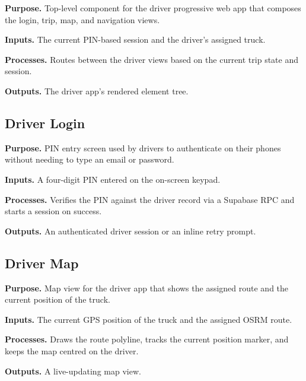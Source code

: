 \noindent\textbf{Purpose.} Top-level component for the driver progressive web app that composes the login, trip, map, and navigation views.

\noindent\textbf{Inputs.} The current PIN-based session and the driver's assigned truck.

\noindent\textbf{Processes.} Routes between the driver views based on the current trip state and session.

\noindent\textbf{Outputs.} The driver app's rendered element tree.



\subsection{Driver Login}
\label{sec:code_frontend_driver_login}

\noindent\textbf{Purpose.} PIN entry screen used by drivers to authenticate on their phones without needing to type an email or password.

\noindent\textbf{Inputs.} A four-digit PIN entered on the on-screen keypad.

\noindent\textbf{Processes.} Verifies the PIN against the driver record via a Supabase RPC and starts a session on success.

\noindent\textbf{Outputs.} An authenticated driver session or an inline retry prompt.



\subsection{Driver Map}
\label{sec:code_frontend_driver_map}

\noindent\textbf{Purpose.} Map view for the driver app that shows the assigned route and the current position of the truck.

\noindent\textbf{Inputs.} The current GPS position of the truck and the assigned OSRM route.

\noindent\textbf{Processes.} Draws the route polyline, tracks the current position marker, and keeps the map centred on the driver.

\noindent\textbf{Outputs.} A live-updating map view.

